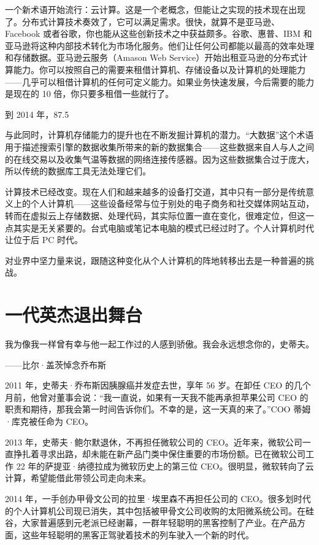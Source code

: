 \documentclass[12pt,UTF8]{ctexbook}
\begin{document}
一个新术语开始流行：云计算。这是一个老概念，但能让之实现的技术现在出现了。分布式计算技术奏效了，它可以满足需求。很快，就算不是亚马逊、Facebook 或者谷歌，你也能从这些创新技术之中获益颇多。谷歌、惠普、IBM 和亚马逊将这种内部技术转化为市场化服务。他们让任何公司都能以最高的效率处理和存储数据。亚马逊云服务（Amason Web Service）开始出租亚马逊的分布式计算能力。你可以按照自己的需要来租借计算机、存储设备以及计算机的处理能力——几乎可以租借计算机的任何可定义能力。如果业务快速发展，今后需要的能力是现在的 10 倍，你只要多租借一些就行了。

到 2014 年，87.5%

与此同时，计算机存储能力的提升也在不断发掘计算机的潜力。“大数据”这个术语用于描述搜索引擎的数据收集所带来的新的数据集合——这些数据来自人与人之间的在线交易以及收集气温等数据的网络连接传感器。因为这些数据集合过于庞大，所以传统的数据库工具无法处理它们。

计算技术已经改变。现在人们和越来越多的设备打交道，其中只有一部分是传统意义上的个人计算机——这些设备经常与位于别处的电子商务和社交媒体网站互动，转而在虚拟云上存储数据、处理代码，其实际位置一直在变化，很难定位，但这一点其实是无关紧要的。台式电脑或笔记本电脑的模式已经过时了。个人计算机时代让位于后 PC 时代。

对业界中坚力量来说，跟随这种变化从个人计算机的阵地转移出去是一种普遍的挑战。





\section{一代英杰退出舞台}


我为像我一样曾有幸与他一起工作过的人感到骄傲。我会永远想念你的，史蒂夫。

——比尔·盖茨悼念乔布斯



2011 年，史蒂夫·乔布斯因胰腺癌并发症去世，享年 56 岁。在卸任 CEO 的几个月前，他曾对董事会说：“我一直说，如果有一天我不能再承担苹果公司 CEO 的职责和期待，那我会第一时间告诉你们。不幸的是，这一天真的来了。”COO 蒂姆·库克被任命为 CEO。

2013 年，史蒂夫·鲍尔默退休，不再担任微软公司的 CEO。近年来，微软公司一直挣扎着寻求出路，却未能在新产品门类中保住重要的市场份额。已在微软公司工作 22 年的萨提亚·纳德拉成为微软历史上的第三位 CEO。很明显，微软转向了云计算，希望能借此带领公司走向未来。

2014 年，一手创办甲骨文公司的拉里·埃里森不再担任公司的 CEO。很多划时代的个人计算机公司现已消失，其中包括被甲骨文公司收购的太阳微系统公司。在硅谷，大家普遍感到元老派已经谢幕，一群年轻聪明的黑客控制了产业。在产品方面，这些年轻聪明的黑客正驾驶着技术的列车驶入一个新的时代。
\end{document}
